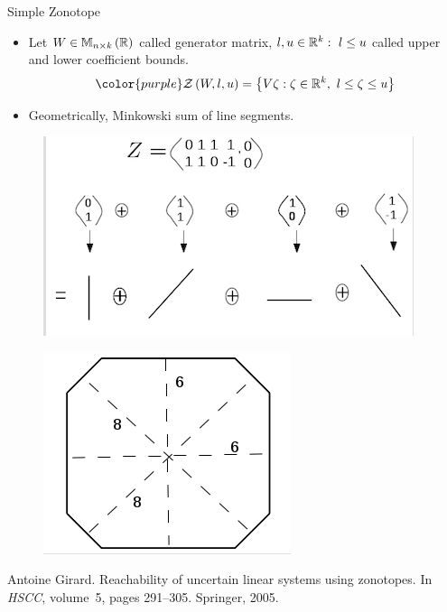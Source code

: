 \begin{frame}{Simple Zonotope}
%
\begin{itemize}
\item Let {\color{purple} $W\in\mathbb{M}_{n\times k}\left(\mathbb{R}\right)$} called {\color{blue}
generator matrix}, {\color{purple} $l,u\in\mathbb{R}^k:~l\leq u$} called
{\color{blue} upper and lower coefficient bounds}.
%
\[
{\color{purple}
\rztope{W}{l}{u}=\set{V\zeta:\zeta\in\reals^k,~l\leq \zeta\leq u}
}
\]
\item Geometrically, {\color{blue} Minkowski sum of line segments}.
\end{itemize}
\begin{minipage}{0.65\textwidth}
\begin{figure}
\includegraphics[trim={2mm 0 2mm 1.5cm},clip,scale=0.45]{figures/rz1.png}
\end{figure}
\end{minipage}
%
\begin{minipage}{0.25\textwidth}
\begin{figure}
\includegraphics[trim={0 3cm 0 0},scale=0.4]{figures/rz2.png}
\end{figure}
\end{minipage}
%
{\small
\begin{thebibliography}{1}

Antoine Girard.
\newblock Reachability of uncertain linear systems using zonotopes.
\newblock In {\em HSCC}, volume~5, pages 291--305. Springer, 2005.

\end{thebibliography}
}
\end{frame}



